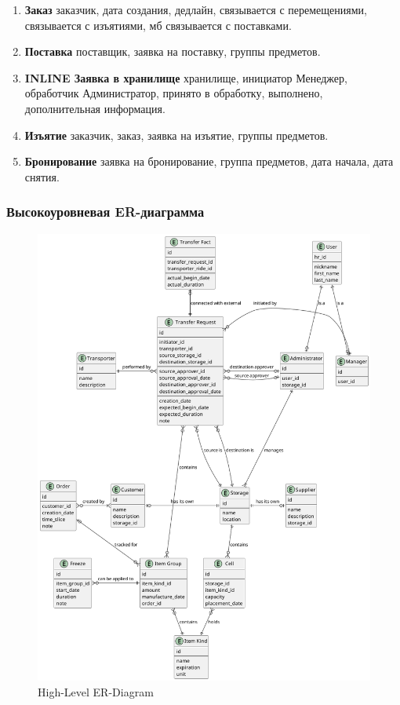 \begin{enumerate}
  \item \textbf{Заказ}
        заказчик,
        дата создания,
        дедлайн,
        связывается с перемещениями,
        связывается с изъятиями,
        мб связывается с поставками.

  \item \textbf{Поставка}
        поставщик,
        заявка на поставку,
        группы предметов.

  \item \textbf{INLINE Заявка в хранилище}
        хранилище,
        инициатор Менеджер,
        обработчик Администратор,
        принято в обработку,
        выполнено,
        дополнительная информация.

  \item \textbf{Изъятие}
        заказчик,
        заказ,
        заявка на изъятие,
        группы предметов.
  
  \item \textbf{Бронирование}
        заявка на бронирование,
        группа предметов,
        дата начала,
        дата снятия.

\end{enumerate}

\newpage

\subsubsection{Высокоуровневая ER-диаграмма}

\begin{figure}[h!]
      \centering
      \includegraphics[width=12cm]{../../doc/spec/figure/er/high-level/Storage Net high-level ER Diagram.png}
      \caption{High-Level ER-Diagram}
\end{figure}

